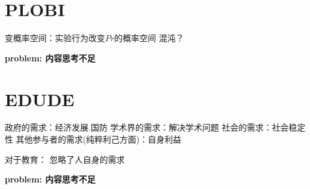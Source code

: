 \documentclass{ctexart}
\begin{document}
\section{\textbf{PLOBI}}

变概率空间：实验行为改变$Pr$的概率空间
混沌？

\textbf{problem: 内容思考不足}

\section{\textbf{EDUDE}}

政府的需求：经济发展.国防
学术界的需求：解决学术问题
社会的需求：社会稳定性
其他参与者的需求(纯粹利己方面)：自身利益

对于教育：
忽略了人自身的需求

\textbf{problem: 内容思考不足}
\end{document}
